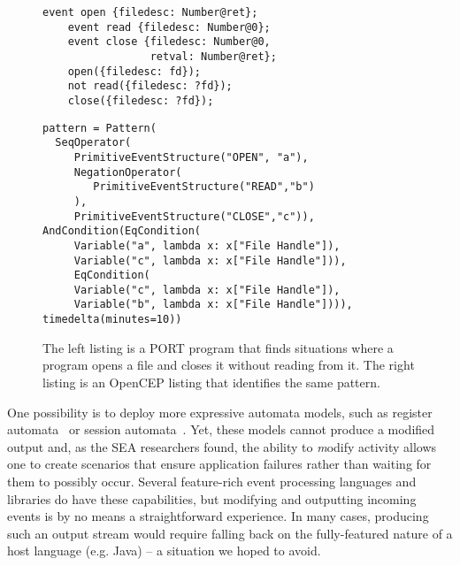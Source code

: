 \begin{figure}[t]
\centering
\begin{minipage}{.5\textwidth}
  \begin{lstlisting}[basicstyle=\small,gobble=4,xleftmargin=.8em]
    event open {filedesc: Number@ret};
    event read {filedesc: Number@0};
    event close {filedesc: Number@0,
                 retval: Number@ret};
    open({filedesc: fd});
    not read({filedesc: ?fd});
    close({filedesc: ?fd});
  \end{lstlisting}
  \end{minipage}%
  \begin{minipage}{.5\textwidth}
  \begin{lstlisting}[basicstyle=\tiny]
pattern = Pattern(
  SeqOperator(
     PrimitiveEventStructure("OPEN", "a"),
     NegationOperator(
        PrimitiveEventStructure("READ","b")
     ),
     PrimitiveEventStructure("CLOSE","c")),
AndCondition(EqCondition(
     Variable("a", lambda x: x["File Handle"]),
     Variable("c", lambda x: x["File Handle"])),
     EqCondition(
     Variable("c", lambda x: x["File Handle"]),
     Variable("b", lambda x: x["File Handle"]))),
timedelta(minutes=10))
  \end{lstlisting}
  \end{minipage}
  \caption{
  The left listing is a PORT program that finds situations
  where a program opens a file and closes it without reading from it.
  The right listing is an OpenCEP listing that identifies the same pattern.
}
  \label{fig:CompareListing}
\end{figure}



One possibility is to deploy more expressive automata models, such as register automata~\cite{DBLP:journals/tcs/KaminskiF94} or session automata~\cite{DBLP:journals/corr/BolligHLM14}. Yet, these models cannot produce a modified output and, as the 
SEA researchers found,  the ability to
{\textit modify} activity allows one to create scenarios that ensure
application failures rather than  waiting for them to possibly occur.
Several feature-rich event processing
languages and libraries do have these capabilities, but
modifying and outputting
incoming events
is by no means a straightforward experience.
In many cases, producing such an output stream  would require
falling back on the fully-featured nature of a host language (e.g. Java) -- a situation
we hoped to avoid.

